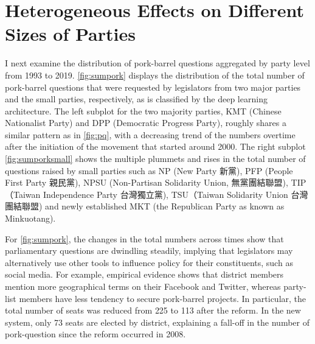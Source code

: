 

\section*{\centering Heterogeneous Effects on Different Sizes of Parties}

I next examine the distribution of pork-barrel questions aggregated by party level from 1993 to 2019. \autoref{fig:sumpork} displays the distribution of the total number of pork-barrel questions that were requested by legislators from two major parties and the small parties, respectively, as is classified by the deep learning architecture. The left subplot for the two majority parties, KMT (Chinese Nationalist Party) and DPP (Democratic Progress Party), roughly shares a similar pattern as in \autoref{fig:pq}, with a decreasing trend of the numbers overtime after the initiation of the movement that started around 2000. The right subplot \autoref{fig:sumporksmall} shows the multiple plummets and rises 
in the total number of questions raised by small parties such as NP (New Party 新黨), PFP (People First Party 親民黨), NPSU (Non-Partisan Solidarity Union, 無黨團結聯盟), TIP（Taiwan Independence Party 台灣獨立黨), TSU（Taiwan Solidarity Union 台灣團結聯盟) and newly established MKT (the Republican Party as known as Minkuotang).



For \autoref{fig:sumpork}, the changes in the total numbers across times show that parliamentary questions are dwindling steadily, implying that legislators may alternatively use other tools to influence policy for their constituents, such as social media. For example, empirical evidence shows that district members mention more geographical terms on their Facebook and Twitter, whereas party-list members have less tendency to secure pork-barrel projects. In particular, the total number of seats was reduced from 225  to 113 after the reform. In the new system, only  73 seats are elected by district, explaining a fall-off in the number of pork-question since the reform occurred in 2008.

